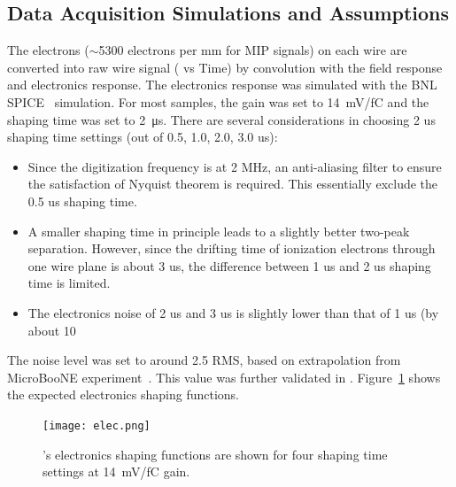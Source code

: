 \subsection{Data Acquisition Simulations and Assumptions}
\label{sec:tools-mc-daq}


  The electrons ($\sim$5300 electrons per mm for MIP signals) on each wire are converted into raw wire signal ( vs Time) by convolution with the field response and electronics response.
  The  electronics response was simulated with the BNL SPICE~\cite{spice} simulation.  For most samples, the  gain was set to \SI{14}{mV/fC} and the shaping time was set to \SI{2}{\micro\second}. There are several considerations in choosing 2 us shaping time settings (out of 0.5, 1.0, 2.0, 3.0 us):
  \begin{itemize}
\item Since the digitization frequency is at 2 MHz, an anti-aliasing filter to ensure the satisfaction of Nyquist theorem is required. This essentially exclude the 0.5 us shaping time. 
\item A smaller shaping time in principle leads to a slightly better two-peak separation. However, since the drifting time of ionization electrons through one wire plane is about 3 us, the difference between 1 us and 2 us shaping time is limited. 
\item The electronics noise of 2 us and 3 us is slightly lower than that of 1 us (by about 10%
\end{itemize}


  
  The noise level was set to around 2.5  RMS, based on extrapolation 
  from MicroBooNE experiment~\cite{Acciarri:2017sde}. This value was further validated in . %
  Figure~\ref{elec_resp} shows the expected electronics shaping functions.

\begin{figure}[!h!tbp]
\centering
\texttt{[image: elec.png]}
\caption['s electronics shaping functions]{'s electronics shaping functions
are shown for four shaping time settings at \SI{14}{mV/fC} gain.}
\label{elec_resp}
\end{figure}


